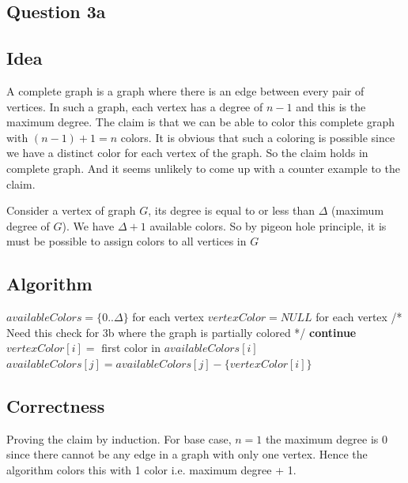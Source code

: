 \documentclass{article}
\begin{document}
\subsection*{Question 3a}

\subsection*{Idea}
A complete graph is a graph where there is an edge between every pair of vertices. In such a graph, each vertex has a degree of \(n-1\) and this is the maximum degree. The claim is that we can be able to color this complete graph with \((n-1)+1 = n\) colors. It is obvious that such a coloring is possible since we have a distinct color for each vertex of the graph. So the claim holds in complete graph. And it seems unlikely to come up with a counter example to the claim.

Consider a vertex of graph $G$, its degree is equal to or less than $\Delta$ (maximum degree of $G$). We have $\Delta+1$ available colors. So by pigeon hole principle, it is must be possible to assign colors to all vertices in $G$

\subsection*{Algorithm}
\begin{algorithm}
\begin{algorithmic}
    \State $availableColors = \{0..\Delta\}$ for each vertex
    \State $vertexColor = NULL$ for each vertex
            \State /* Need this check for 3b where the graph is partially colored */
            \State \textbf{continue}
        \EndIf
        \State $vertexColor[i] = $ first color in $availableColors[i]$
                \State $availableColors[j] = availableColors[j] - \{vertexColor[i]\}$
            \EndIf
        \EndFor
    \EndFor
\EndProcedure
\end{algorithmic}
\end{algorithm}

\subsection*{Correctness}
Proving the claim by induction. For base case, $n=1$ the maximum degree is 0 since there cannot be any edge in a graph with only one vertex. Hence the algorithm colors this with 1 color i.e. maximum degree + 1.
\end{document}
